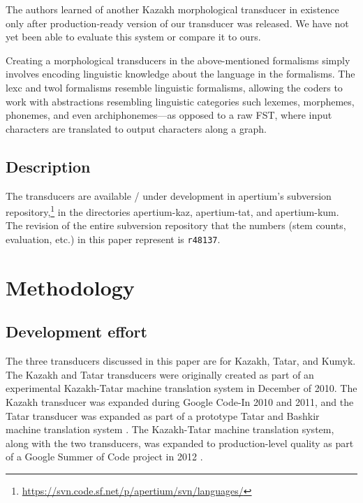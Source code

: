 \documentclass[a4paper,11pt,twocolumn]{article}
\begin{document}
The authors learned of another Kazakh morphological transducer in existence \citep{bekmanova2013} only after production-ready version of our transducer was released.  We have not yet been able to evaluate this system or compare it to ours.

Creating a morphological transducers in the above-mentioned formalisms simply involves encoding linguistic knowledge about the language in the formalisms.  The lexc and twol formalisms resemble linguistic formalisms, allowing the coders to work with abstractions resembling linguistic categories such lexemes, morphemes, phonemes, and even archiphonemes---as opposed to a raw FST, where input characters are translated to output characters along a graph.

\subsection{Description}

The transducers are available / under development in apertium's subversion repository,\footnote{\url{https://svn.code.sf.net/p/apertium/svn/languages/}} in the directories apertium-kaz, apertium-tat, and apertium-kum.  The revision of the entire subversion repository that the numbers (stem counts, evaluation, etc.) in this paper represent is \texttt{r48137}.


\section{Methodology}





\subsection{Development effort}

The three transducers discussed in this paper are for Kazakh, Tatar, and Kumyk.  The Kazakh and Tatar transducers were originally created as part of an experimental Kazakh-Tatar machine translation system in December of 2010.  The Kazakh transducer was expanded during Google Code-In 2010 and 2011, and the Tatar transducer was expanded as part of a prototype Tatar and Bashkir machine translation system \citep{tyerswashingtonsalimzyanbattalov12}.  The Kazakh-Tatar machine translation system, along with the two transducers, was expanded to production-level quality as part of a Google Summer of Code project in 2012 \citep{salimzyanov2013}.
\end{document}
